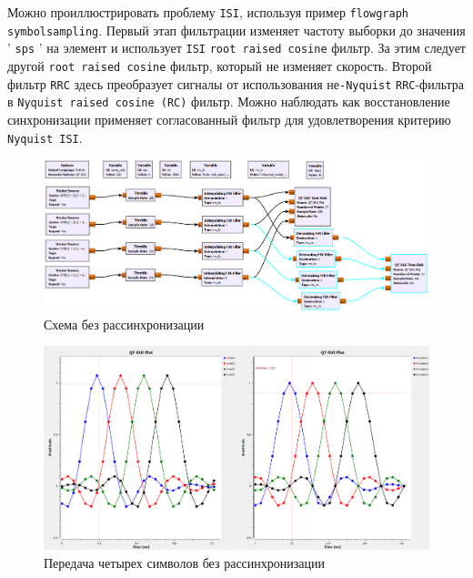 \documentclass[a4paper]{article}
\begin{document}
           Можно проиллюстрировать проблему \texttt{ISI}, используя пример \texttt{flowgraph \\symbolsampling}. Первый этап фильтрации изменяет частоту выборки до значения ’ \texttt{sps} ’ на элемент и использует \texttt{ISI} \texttt{root raised cosine} фильтр. За этим следует другой \texttt{root raised cosine} фильтр, который не изменяет скорость. Второй фильтр \texttt{RRC} здесь преобразует сигналы от использования не\texttt{-Nyquist} \texttt{RRC}-фильтра в \texttt{Nyquist raised cosine (RC)} фильтр. Можно наблюдать как восстановление синхронизации применяет согласованный фильтр для удовлетворения критерию \texttt{Nyquist ISI}.
            
            \begin{figure}[H]
                \centering
                \includegraphics[width=\textwidth]{ex_3_1.png}
                \caption{Схема без рассинхронизации}
                \label{fig:ex_3_1}
            \end{figure}
            
            \begin{figure}[H]
                \centering
                \includegraphics[width=\textwidth]{ex_3_2.png}
                \caption{Передача четырех символов без рассинхронизации}
                \label{fig:ex_3_2}
            \end{figure}
            
\end{document}
